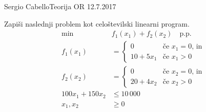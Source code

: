 \begin{naloga}{Sergio Cabello}{Teorija OR 12.7.2017}
\begin{vprasanje}
Zapiši naslednji problem kot celoštevilski linearni program.
\begin{align*}
\min & f_1(x_1) + f_2(x_2) \quad \text{p.p.} \\
f_1(x_1) &= \begin{cases}
            0         & \text{če $x_1 = 0$, in} \\
            10 + 5x_1 & \text{če $x_1 > 0$}
            \end{cases} \\
f_2(x_2) &= \begin{cases}
            0         & \text{če $x_2 = 0$, in} \\
            20 + 4x_2 & \text{če $x_2 > 0$}
            \end{cases} \\
100x_1 + 150x_2 &\le 10\,000 \\
x_1, x_2 &\ge 0
\end{align*}
\end{vprasanje}
\begin{odgovor}
\end{odgovor}
\end{naloga}
